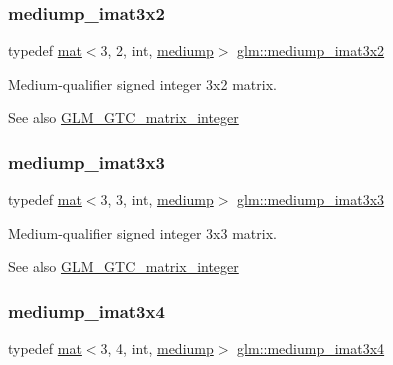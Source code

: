 \subsubsection{\texorpdfstring{mediump\+\_\+imat3x2}{mediump\_imat3x2}}
{\footnotesize\ttfamily typedef \hyperlink{structglm_1_1mat}{mat}$<$3, 2, int, \hyperlink{namespaceglm_a36ed105b07c7746804d7fdc7cc90ff25a6416f3ea0c9025fb21ed50c4d6620482}{mediump}$>$ \hyperlink{group__gtc__matrix__integer_gae3f0a14fb81eb2edc0caf5b131adb969}{glm\+::mediump\+\_\+imat3x2}}

Medium-\/qualifier signed integer 3x2 matrix. \begin{DoxySeeAlso}{See also}
\hyperlink{group__gtc__matrix__integer}{G\+L\+M\+\_\+\+G\+T\+C\+\_\+matrix\+\_\+integer} 
\end{DoxySeeAlso}
\mbox{\label{group__gtc__matrix__integer_ga1304a2da9c3f5937aa8c4684d638d09c}} 
\subsubsection{\texorpdfstring{mediump\+\_\+imat3x3}{mediump\_imat3x3}}
{\footnotesize\ttfamily typedef \hyperlink{structglm_1_1mat}{mat}$<$3, 3, int, \hyperlink{namespaceglm_a36ed105b07c7746804d7fdc7cc90ff25a6416f3ea0c9025fb21ed50c4d6620482}{mediump}$>$ \hyperlink{group__gtc__matrix__integer_ga1304a2da9c3f5937aa8c4684d638d09c}{glm\+::mediump\+\_\+imat3x3}}

Medium-\/qualifier signed integer 3x3 matrix. \begin{DoxySeeAlso}{See also}
\hyperlink{group__gtc__matrix__integer}{G\+L\+M\+\_\+\+G\+T\+C\+\_\+matrix\+\_\+integer} 
\end{DoxySeeAlso}
\mbox{\label{group__gtc__matrix__integer_gae0ab87609ac842f31be9e581caafa0f0}} 
\subsubsection{\texorpdfstring{mediump\+\_\+imat3x4}{mediump\_imat3x4}}
{\footnotesize\ttfamily typedef \hyperlink{structglm_1_1mat}{mat}$<$3, 4, int, \hyperlink{namespaceglm_a36ed105b07c7746804d7fdc7cc90ff25a6416f3ea0c9025fb21ed50c4d6620482}{mediump}$>$ \hyperlink{group__gtc__matrix__integer_gae0ab87609ac842f31be9e581caafa0f0}{glm\+::mediump\+\_\+imat3x4}}

